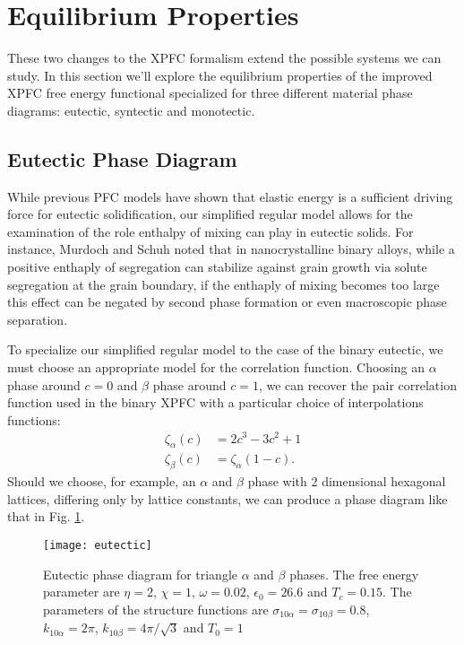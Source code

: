\section{Equilibrium Properties} %

These two changes to the XPFC formalism extend the possible systems we can
study. In this section we'll explore the equilibrium properties of the improved
XPFC free energy functional specialized for three different material phase
diagrams: eutectic, syntectic and monotectic.

\subsection{Eutectic Phase Diagram} %

While previous PFC models have shown that elastic energy is a sufficient
driving force for eutectic solidification, our simplified regular model allows
for the examination of the role enthalpy of mixing can play in eutectic solids.
For instance, Murdoch and Schuh noted that in nanocrystalline binary alloys,
while a positive enthaply of segregation can stabilize against grain growth via
solute segregation at the grain boundary, if the enthaply of mixing becomes too
large this effect can be negated by second phase formation or even macroscopic
phase separation\cite{MURDOCH13}. 

To specialize our simplified regular model to the case of the binary eutectic,
we must choose an appropriate model for the correlation function. Choosing an
$\alpha$ phase around $c = 0$ and $\beta$ phase around $c = 1$, we can recover
the pair correlation function used in the binary XPFC with a
particular choice of interpolations functions: 
%
\begin{align}
   \zeta_\alpha(c) &= 2c^3 - 3c^2 + 1 \\
   \zeta_\beta(c) &= \zeta_\alpha(1 - c).
\end{align}
%
Should we choose, for example, an $\alpha$ and $\beta$ phase with 2 dimensional
hexagonal lattices, differing only by lattice constants, we can produce a phase
diagram like that in Fig. \ref{eutectic}.  

\begin{figure}[h]
    \centering	
    \texttt{[image: eutectic]}
    \caption[Eutectic Phase Diagram]{
        \label{eutectic} Eutectic phase diagram for triangle $\alpha$ and
        $\beta$ phases. The free energy parameter are $\eta = 2$, $\chi = 1$,
        $\omega=0.02$, $\epsilon_0 = 26.6$ and $T_c = 0.15$. The parameters of the
        structure functions are $\sigma_{10\alpha} = \sigma_{10\beta} = 0.8$,
        $k_{10\alpha} = 2\pi$, $k_{10\beta} = 4\pi/\sqrt{3}$ and $T_0 = 1$
    }
\end{figure}

